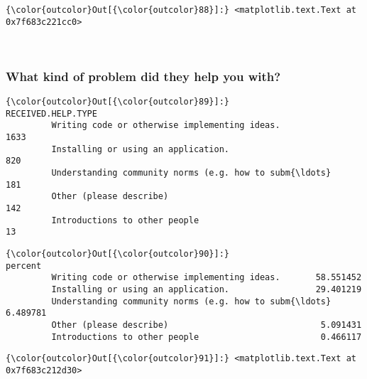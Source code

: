 \documentclass[11pt]{article}
\begin{document}
            \begin{Verbatim}[commandchars=\\\{\}]
{\color{outcolor}Out[{\color{outcolor}88}]:} <matplotlib.text.Text at 0x7f683c221cc0>
\end{Verbatim}
        
    \begin{center}
    \end{center}
    { \hspace*{\fill} \\}
    
    \subsubsection{What kind of problem did they help you
with?}\label{what-kind-of-problem-did-they-help-you-with}


            \begin{Verbatim}[commandchars=\\\{\}]
{\color{outcolor}Out[{\color{outcolor}89}]:}                                                     RECEIVED.HELP.TYPE
         Writing code or otherwise implementing ideas.                     1633
         Installing or using an application.                                820
         Understanding community norms (e.g. how to subm{\ldots}                 181
         Other (please describe)                                            142
         Introductions to other people                                       13
\end{Verbatim}
        

            \begin{Verbatim}[commandchars=\\\{\}]
{\color{outcolor}Out[{\color{outcolor}90}]:}                                                       percent
         Writing code or otherwise implementing ideas.       58.551452
         Installing or using an application.                 29.401219
         Understanding community norms (e.g. how to subm{\ldots}   6.489781
         Other (please describe)                              5.091431
         Introductions to other people                        0.466117
\end{Verbatim}
        

            \begin{Verbatim}[commandchars=\\\{\}]
{\color{outcolor}Out[{\color{outcolor}91}]:} <matplotlib.text.Text at 0x7f683c212d30>
\end{Verbatim}
        
\end{document}
